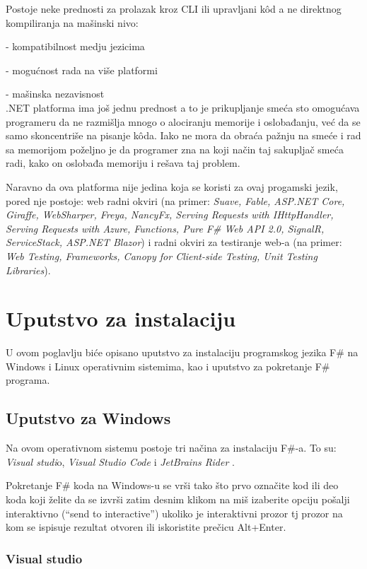 \documentclass[a4paper]{article}
\begin{document}
Postoje neke prednosti za prolazak kroz CLI ili upravljani kôd a ne direktnog kompiliranja na mašinski nivo:	

	- kompatibilnost medju jezicima
	
	- mogućnost rada na više platformi
	
	- mašinska nezavisnost
\\

.NET platforma ima još jednu prednost a to je prikupljanje smeća sto omogućava programeru da ne razmišlja mnogo o alociranju memorije i oslobađanju, već da se samo skoncentriše na pisanje kôda. Iako ne mora da obraća pažnju na smeće i rad sa memorijom poželjno je da programer zna na koji način taj sakupljač smeća radi, kako on oslobađa memoriju i rešava taj problem.

Naravno da ova platforma nije jedina koja se koristi za ovaj progamski jezik, pored nje postoje: web radni okviri (na primer: {\em Suave, Fable, ASP.NET Core, Giraffe, WebSharper, Freya, NancyFx, Serving Requests with IHttpHandler, Serving Requests with Azure, Functions, Pure F\# Web API 2.0, SignalR, ServiceStack, ASP.NET Blazor}) i radni okviri za testiranje web-a (na primer: {\em Web Testing, Frameworks, Canopy for Client-side Testing, Unit Testing Libraries})\cite{fwFs}.

\section{Uputstvo za instalaciju}

U ovom poglavlju biće opisano uputstvo za instalaciju programskog jezika F\# na Windows i Linux operativnim sistemima, kao i uputstvo za pokretanje F\# programa.

\subsection{Uputstvo za Windows}

Na ovom operativnom sistemu postoje tri načina za instalaciju F\#-a. To su: {\em Visual studi}o\cite{vStud}, {\em Visual Studio Code} \cite{vStudCode} i {\em JetBrains Rider} \cite{jetBrains}.

Pokretanje F\# koda na Windows-u se vrši tako što prvo označite kod ili deo koda koji želite da se izvrši zatim desnim klikom na miš izaberite opciju pošalji interaktivno (“send to interactive”) ukoliko je interaktivni prozor tj prozor na kom se ispisuje rezultat otvoren ili iskoristite prečicu Alt+Enter.

\subsubsection{Visual studio}
	
\end{document}
